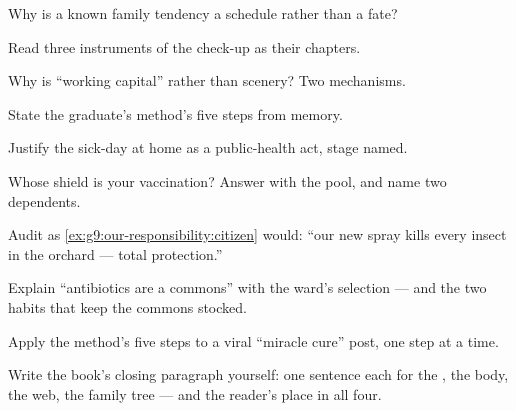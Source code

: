 \begin{exercise}[$\star$]\label{exo:g9:our-responsibility:3}
Why is a known family tendency a schedule rather than a
fate?
\end{exercise}

\begin{exercise}[$\star$]\label{exo:g9:our-responsibility:4}
Read three instruments of the check-up as their chapters.
\end{exercise}

\begin{exercise}[$\star$]\label{exo:g9:our-responsibility:5}
Why is  ``working capital'' rather than
scenery? Two mechanisms.
\end{exercise}

\begin{exercise}[$\star$]\label{exo:g9:our-responsibility:6}
State the graduate's method's five steps from memory.
\end{exercise}

\begin{exercise}[$\star\star$]\label{exo:g9:our-responsibility:7}
Justify the sick-day at home as a public-health act,
stage named.
\end{exercise}

\begin{exercise}[$\star\star$]\label{exo:g9:our-responsibility:8}
Whose shield is your vaccination? Answer with the pool,
and name two dependents.
\end{exercise}

\begin{exercise}[$\star\star$]\label{exo:g9:our-responsibility:9}
Audit as \cref{ex:g9:our-responsibility:citizen} would:
``our new spray kills every insect in the orchard ---
total protection.''
\end{exercise}

\begin{exercise}[$\star\star$]\label{exo:g9:our-responsibility:10}
Explain ``antibiotics are a commons'' with the ward's
selection --- and the two habits that keep the commons
stocked.
\end{exercise}

\begin{exercise}[$\star\star$]\label{exo:g9:our-responsibility:11}
Apply the method's five steps to a viral ``miracle
cure'' post, one step at a time.
\end{exercise}

\begin{exercise}[$\star\star\star$]\label{exo:g9:our-responsibility:12}
Write the book's closing paragraph yourself: one
sentence each for the , the body, the web, the
family tree --- and the reader's place in all four.
\end{exercise}

